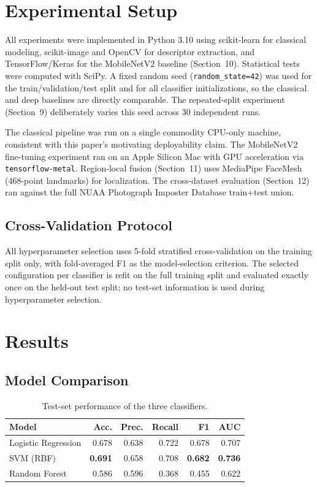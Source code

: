 \documentclass[11pt]{article}
\begin{document}
\section{Experimental Setup}

All experiments were implemented in Python 3.10 using scikit-learn for classical modeling, scikit-image and OpenCV for descriptor extraction, and TensorFlow/Keras for the MobileNetV2 baseline (Section~10). Statistical tests were computed with SciPy. A fixed random seed (\texttt{random\_state=42}) was used for the train/validation/test split and for all classifier initializations, so the classical and deep baselines are directly comparable. The repeated-split experiment (Section~9) deliberately varies this seed across 30 independent runs.

The classical pipeline was run on a single commodity CPU-only machine, consistent with this paper's motivating deployability claim. The MobileNetV2 fine-tuning experiment ran on an Apple Silicon Mac with GPU acceleration via \texttt{tensorflow-metal}. Region-local fusion (Section~11) uses MediaPipe FaceMesh (468-point landmarks) for localization. The cross-dataset evaluation (Section~12) ran against the full NUAA Photograph Imposter Database train+test union.

\subsection{Cross-Validation Protocol}

All hyperparameter selection uses 5-fold stratified cross-validation on the training split only, with fold-averaged F1 as the model-selection criterion. The selected configuration per classifier is refit on the full training split and evaluated exactly once on the held-out test split; no test-set information is used during hyperparameter selection.

\section{Results}

\subsection{Model Comparison}

\begin{table}[htbp]
\centering
\caption{Test-set performance of the three classifiers.}
\label{tab:modelcomp}
\begin{tabular}{lrrrrr}
\toprule
Model & Acc. & Prec. & Recall & F1 & AUC \\
\midrule
Logistic Regression & 0.678 & 0.638 & 0.722 & 0.678 & 0.707 \\
SVM (RBF) & \textbf{0.691} & 0.658 & 0.708 & \textbf{0.682} & \textbf{0.736} \\
Random Forest & 0.586 & 0.596 & 0.368 & 0.455 & 0.622 \\
\bottomrule
\end{tabular}
\end{table}
\end{document}
